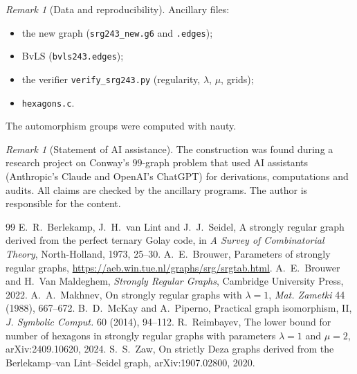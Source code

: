 \documentclass[11pt]{amsart}
\theoremstyle{remark}
\newtheorem{remark}[theorem]{Remark}
\begin{document}
\begin{remark}[Data and reproducibility]
Ancillary files:
\begin{itemize}
\item the new graph (\texttt{srg243\_new.g6} and \texttt{.edges});
\item BvLS (\texttt{bvls243.edges});
\item the verifier \texttt{verify\_srg243.py} (regularity, $\lambda$, $\mu$, grids);
\item \texttt{hexagons.c}.
\end{itemize}
The automorphism groups were computed with nauty.
\end{remark}

\begin{remark}[Statement of AI assistance]
The construction was found during a research project on Conway's $99$-graph problem that used AI assistants (Anthropic's
Claude and OpenAI's ChatGPT) for derivations, computations and audits. All claims are checked by the ancillary programs.
The author is responsible for the content.
\end{remark}

\begin{thebibliography}{99}
 E.~R.~Berlekamp, J.~H.~van Lint and J.~J.~Seidel, A strongly regular graph derived from the perfect
ternary Golay code, in \emph{A Survey of Combinatorial Theory}, North-Holland, 1973, 25--30.
 A.~E.~Brouwer, Parameters of strongly regular graphs, \url{https://aeb.win.tue.nl/graphs/srg/srgtab.html}.
 A.~E.~Brouwer and H.~Van Maldeghem, \emph{Strongly Regular Graphs}, Cambridge University Press, 2022.
 A.~A.~Makhnev, On strongly regular graphs with $\lambda=1$, \emph{Mat. Zametki} 44 (1988), 667--672.
 B.~D.~McKay and A.~Piperno, Practical graph isomorphism, II, \emph{J. Symbolic Comput.} 60 (2014),
94--112.
 R.~Reimbayev, The lower bound for number of hexagons in strongly regular graphs with parameters
$\lambda=1$ and $\mu=2$, arXiv:2409.10620, 2024.
 S.~S.~Zaw, On strictly Deza graphs derived from the Berlekamp--van Lint--Seidel graph,
arXiv:1907.02800, 2020.
\end{thebibliography}
\end{document}
